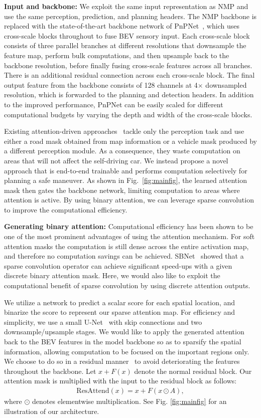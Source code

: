 \textbf{Input and backbone:} We exploit the same input representation as NMP and use the same perception, prediction, and planning headers.
The NMP backbone is replaced with the state-of-the-art backbone network of  PnPNet~\cite{pnpnet}, which uses cross-scale blocks throughout to fuse BEV sensory input. Each cross-scale block consists of three parallel branches at different resolutions that downsample the feature map, perform bulk computations, and then upsample back to the backbone resolution, before finally fusing cross-scale features across all branches. There is an additional residual connection across each cross-scale block. The final output feature from the backbone consists of 128 channels at 4$\times$ downsampled resolution, which is forwarded to the planning and detection headers.
In addition to the improved performance, PnPNet can be easily scaled for different computational budgets by varying the depth and width of the cross-scale blocks.

Existing attention-driven approaches~\cite{sbnet} tackle only the perception task and use either a road mask obtained from map information or a vehicle mask produced by a different perception module. As a consequence, they waste computation on areas that will not affect the self-driving car. We instead propose a novel approach that is end-to-end trainable and performs computation selectively for planning a safe maneuver.
As shown in Fig.~\ref{fig:mainfig}, the learned attention mask then gates the backbone network, limiting computation to areas where attention is active. By
using binary attention, we can leverage sparse convolution to improve the computational efficiency.

\textbf{Generating binary attention:}
Computational efficiency has been shown to be one of the most prominent advantages of using the
attention mechanism. For soft attention masks the computation is still dense across the entire
activation map, and therefore no computation savings can be achieved.  SBNet~\cite{sbnet} showed that a sparse convolution operator can achieve significant speed-ups with a given
discrete binary attention mask. Here, we would also like to exploit the computational benefit of
sparse convolution by using discrete attention outputs.

We utilize a network to
predict a scalar score for each spatial location, and binarize the score to represent our sparse attention map. For efficiency and simplicity, we use a small U-Net~\cite{unet} with skip
connections and two downsample/upsample stages.
We would like to apply the generated attention back to the BEV features in the
model backbone so as to sparsify the spatial information, allowing computation to be focused on the
important regions only. We choose to do so in a residual manner~\cite{resattn,sbnet} to avoid
deteriorating the features throughout the backbone. Let $x + F(x)$ denote the normal residual block.
Our attention mask is multiplied with the input to the residual block as follows:
\begin{align}
\mathrm{ResAttend}(x) = x + F(x \odot A),
\end{align}
where $\odot$ denotes elementwise multiplication. See Fig. \ref{fig:mainfig} for an illustration of our architecture.

